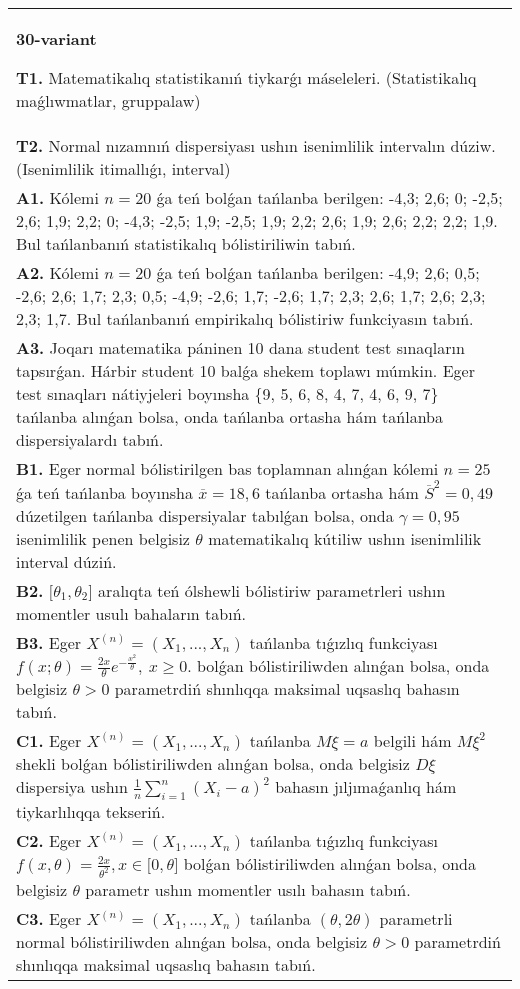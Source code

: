 \documentclass{article}
\begin{document}
\begin{tabular}{m{17cm}}
\textbf{30-variant}
\newline

\textbf{T1.} Matematikalıq statistikanıń tiykarǵı máseleleri. (Statistikalıq maǵlıwmatlar, gruppalaw)
 \\
\textbf{T2.} 
Normal nızamnıń dispersiyası ushın isenimlilik intervalın dúziw. (Isenimlilik itimallıǵı, interval)
 \\
\textbf{A1.} 
Kólemi \(n = 20\) ǵa teń bolǵan tańlanba berilgen: -4,3; 2,6; 0; -2,5; 2,6; 1,9; 2,2; 0; -4,3; -2,5; 1,9; -2,5; 1,9; 2,2; 2,6; 1,9; 2,6; 2,2; 2,2; 1,9. Bul tańlanbanıń statistikalıq bólistiriliwin tabıń.
 \\
\textbf{A2.} 
Kólemi \(n = 20\) ǵa teń bolǵan tańlanba berilgen: -4,9; 2,6; 0,5; -2,6; 2,6; 1,7; 2,3; 0,5; -4,9; -2,6; 1,7; -2,6; 1,7; 2,3; 2,6; 1,7; 2,6; 2,3; 2,3; 1,7. Bul tańlanbanıń empirikalıq bólistiriw funkciyasın tabıń.
 \\
\textbf{A3.} 
Joqarı matematika páninen 10 dana student test sınaqların tapsırǵan. Hárbir student 10 balǵa shekem toplawı múmkin. Eger test sınaqları nátiyjeleri boyınsha \{9, 5, 6, 8, 4, 7, 4, 6, 9, 7\} tańlanba alınǵan bolsa, onda tańlanba ortasha hám tańlanba dispersiyalardı tabıń.
 \\
\textbf{B1.} 
Eger normal bólistirilgen bas toplamnan alınǵan kólemi \(n = 25\) ǵa teń tańlanba boyınsha \(\overline{x} = 18,6\) tańlanba ortasha hám \({\overline{S}}^{2} = 0,49\) dúzetilgen tańlanba dispersiyalar tabılǵan bolsa, onda \(\gamma = 0,95\) isenimlilik penen belgisiz \(\theta\) matematikalıq kútiliw ushın isenimlilik interval dúziń.
 \\
\textbf{B2.} 
\(\lbrack\theta_{1},\theta_{2}\rbrack\) aralıqta teń ólshewli bólistiriw parametrleri ushın momentler usulı bahaların tabıń.
 \\
\textbf{B3.} 
Eger \(X^{(n)} = \left( X_{1},...,X_{n} \right)\) tańlanba tıǵızlıq funkciyası \(f(x;\theta) = \frac{2x}{\theta}e^{- \frac{x^{2}}{\theta}},\ x \geq 0\). bolǵan bólistiriliwden alınǵan bolsa, onda belgisiz \(\theta > 0\) parametrdiń shınlıqqa maksimal uqsaslıq bahasın tabıń.
 \\
\textbf{C1.} 
Eger \(X^{(n)} = \left( X_{1},...,X_{n} \right)\) tańlanba \(M\xi = a\) belgili hám \(M\xi^{2}\) shekli bolǵan bólistiriliwden alınǵan bolsa, onda belgisiz \(D\xi\) dispersiya ushın \(\frac{1}{n}\sum_{i = 1}^{n}\left( X_{i} - a \right)^{2}\) bahasın jıljımaǵanlıq hám tiykarlılıqqa tekseriń.
 \\
\textbf{C2.} 
Eger \(X^{(n)} = \left( X_{1},...,X_{n} \right)\) tańlanba tıǵızlıq funkciyası
$f(x,\theta) = \frac{2x}{\theta^{2}},x \in \lbrack 0,\theta\rbrack$
bolǵan bólistiriliwden alınǵan bolsa, onda belgisiz \(\theta\) parametr ushın momentler usılı bahasın tabıń.
 \\
\textbf{C3.} 
Eger \(X^{(n)} = \left( X_{1},...,X_{n} \right)\) tańlanba \((\theta,2\theta)\) parametrli normal bólistiriliwden alınǵan bolsa, onda belgisiz \(\theta > 0\) parametrdiń shınlıqqa maksimal uqsaslıq bahasın tabıń.
 \\

\end{tabular}
\vspace{1cm}
\end{document}
